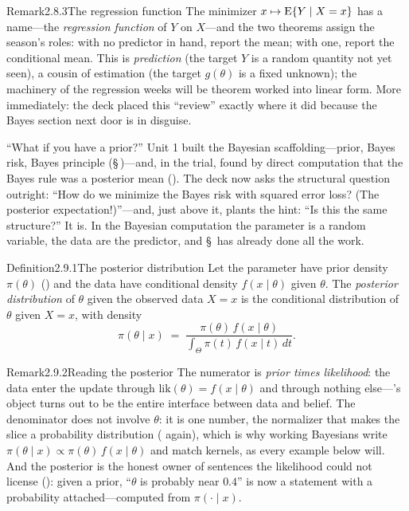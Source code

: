 \documentclass[main.tex]{subfiles}
\begin{document}
\begin{ObjL}{Remark}{2.8.3}{The regression function}
The minimizer $x\mapsto \mathrm{E}\{Y\mid X=x\}$ has a name---the \emph{regression function} of $Y$
on $X$---and the two theorems assign the season's roles: with no predictor in hand, report
the mean; with one, report the conditional mean. This is \emph{prediction} (the target $Y$
is a random quantity not yet seen), a cousin of estimation (the target $g(\theta)$ is a
fixed unknown); the machinery of the regression weeks will be theorem  worked
into linear form. More immediately: the deck placed this ``review'' exactly where it did
because the Bayes section next door is  in disguise.
\end{ObjL}


``What if you have a prior?'' Unit 1 built the Bayesian scaffolding---prior, Bayes risk,
Bayes principle (\S\,)---and, in the trial, found by direct computation that the
Bayes rule was a posterior mean (). The deck now asks the structural question
outright: ``How do we minimize the Bayes risk with squared error loss? (The posterior
expectation!)''---and, just above it, plants the hint: ``Is this the same structure?'' It
is. In the Bayesian computation the parameter is a random variable, the data are the
predictor, and \S\, has already done all the work.

\begin{Obj}{Definition}{2.9.1}{The posterior distribution}
Let the parameter have prior density $\pi(\theta)$ () and the data have
conditional density $f(x\mid\theta)$ given $\theta$. The \emph{posterior distribution} of
$\theta$ given the observed data $X=x$ is the conditional distribution of $\theta$ given
$X=x$, with density
\[ \pi(\theta\mid x) \;=\;
   \frac{\pi(\theta)\, f(x\mid\theta)}{\displaystyle\int_{\Theta}
   \pi(t)\, f(x\mid t)\,dt} . \]
\end{Obj}

\begin{ObjL}{Remark}{2.9.2}{Reading the posterior}
The numerator is \emph{prior times likelihood}: the data enter the update through
$\mathrm{lik}(\theta)=f(x\mid\theta)$ and through nothing else---'s object turns
out to be the entire interface between data and belief. The denominator does not involve
$\theta$: it is one number, the normalizer that makes the slice a probability distribution
( again), which is why working Bayesians write
$\pi(\theta\mid x)\propto\pi(\theta)\,f(x\mid\theta)$ and match kernels, as every example
below will. And the posterior is the honest owner of sentences the likelihood could not
license (): given a prior, ``$\theta$ is probably near $0.4$'' is now a
statement with a probability attached---computed from $\pi(\cdot\mid x)$.
\end{ObjL}
\end{document}
